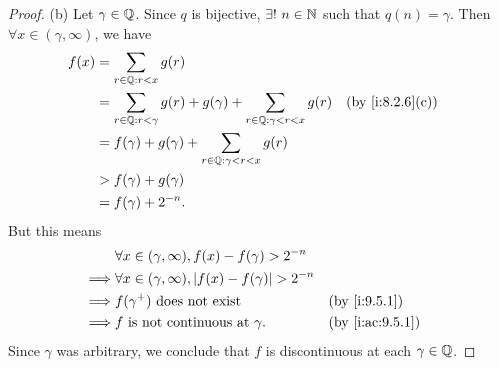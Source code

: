 \begin{proof}{(b)}
  Let \(\gamma \in \mathbb{Q}\).
  Since \(q\) is bijective, \(\exists!\ n \in \mathbb{N}\) such that \(q(n) = \gamma\).
  Then \(\forall x \in (\gamma, \infty)\), we have
  \begin{align*}
    f(x) & = \sum_{r \in \Q : r < x} g(r)                                                                               \\
         & = \sum_{r \in \Q : r < \gamma} g(r) + g(\gamma) + \sum_{r \in \Q : \gamma < r < x} g(r) &  & \by{i:8.2.6}[c] \\
         & = f(\gamma) + g(\gamma) + \sum_{r \in \Q : \gamma < r < x} g(r)                                              \\
         & > f(\gamma) + g(\gamma)                                                                                      \\
         & = f(\gamma) + 2^{-n}.
  \end{align*}
  But this means
  \begin{align*}
             & \forall x \in (\gamma, \infty), f(x) - f(\gamma) > 2^{-n}                            \\
    \implies & \forall x \in (\gamma, \infty), \abs{f(x) - f(\gamma)} > 2^{-n}                      \\
    \implies & f(\gamma^+) \text{ does not exist}                              &  & \by{i:9.5.1}    \\
    \implies & f \text{ is not continuous at } \gamma.                         &  & \by{i:ac:9.5.1}
  \end{align*}
  Since \(\gamma\) was arbitrary, we conclude that \(f\) is discontinuous at each \(\gamma \in \mathbb{Q}\).
\end{proof}

